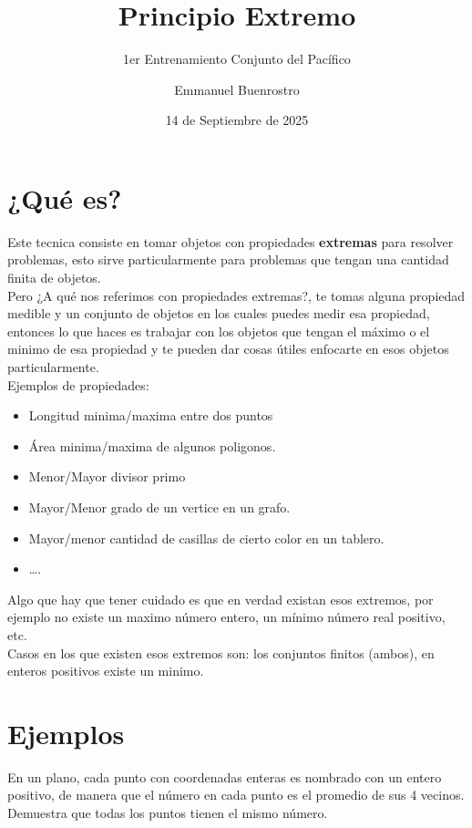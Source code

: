 \documentclass[11pt]{scrartcl}
\title {Principio Extremo}
\subtitle {1er Entrenamiento Conjunto del Pacífico }
\author{Emmanuel Buenrostro}
\date{14 de Septiembre de 2025}
\begin{document}
\maketitle

\section{¿Qué es?}
Este tecnica consiste en tomar objetos con propiedades \textbf{extremas} para resolver problemas, esto sirve particularmente 
para problemas que tengan una cantidad finita de objetos. \\


Pero ¿A qué nos referimos con propiedades extremas?, te tomas alguna propiedad medible y un conjunto de objetos en los cuales puedes medir esa propiedad, entonces 
lo que haces es trabajar con los objetos que tengan el máximo o el minimo de esa propiedad y te pueden dar cosas útiles enfocarte en esos objetos particularmente.  \\

Ejemplos de propiedades: 

\begin{itemize}
    \item Longitud minima/maxima entre dos puntos
    \item Área minima/maxima de algunos poligonos.
    \item Menor/Mayor divisor primo
    \item Mayor/Menor grado de un vertice en un grafo.
    \item Mayor/menor cantidad de casillas de cierto color en un tablero.
    \item \ldots.
\end{itemize}


Algo que hay que tener cuidado es que en verdad existan esos extremos, por ejemplo no existe un maximo número entero, un mínimo número real positivo, etc.  \\
Casos en los que existen esos extremos son:  los conjuntos finitos (ambos), en enteros positivos existe un minimo.

\section{Ejemplos}

\begin{example} 
    En un plano, cada punto con coordenadas enteras es nombrado con un entero positivo, de manera que el número en cada punto es el promedio de sus 4 vecinos. Demuestra que todas los puntos tienen el mismo número.
\end{example}
\end{document}
